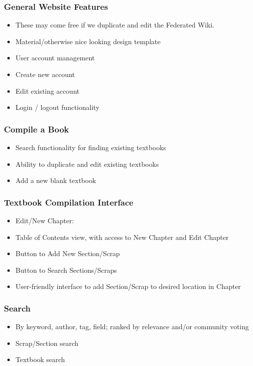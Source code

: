 \documentclass[letterpaper, 10pt, draftclsnofoot, compsoc, onecolumn]{IEEEtran}
\begin{document}
{{\subsubsection[System feature 1: General Website Features]{\rmfamily\bfseries\color{black} General Website Features}

\begin{itemize}
\item These may come free if we duplicate and edit the Federated Wiki.
\item Material/otherwise nice looking design template
\item User account management
\item Create new account
\item Edit existing account
\item Login / logout functionality
\end{itemize}

\subsubsection[System feature 2: Compile a book]{\rmfamily\bfseries\color{black} Compile a Book}
\begin{itemize}
\item Search functionality for finding existing textbooks
\item Ability to duplicate and edit existing textbooks
\item Add a new blank textbook
\end{itemize}

\subsubsection[System feature 3: Textbook Compilation Interface]{\rmfamily\bfseries\color{black} Textbook Compilation Interface}
\begin{itemize}
\item Edit/New Chapter:
\item Table of Contents view, with access to New Chapter and Edit Chapter
\item Button to Add New Section/Scrap
\item Button to Search Sections/Scraps
\item User-friendly interface to add Section/Scrap to desired location in Chapter
\end{itemize}

\subsubsection[System feature 4: Search Feature]{\rmfamily\bfseries\color{black} Search}
\begin{itemize}
\item By keyword, author, tag, field; ranked by relevance and/or community voting
\item Scrap/Section search
\item Textbook search
\end{itemize}

}}
\end{document}
